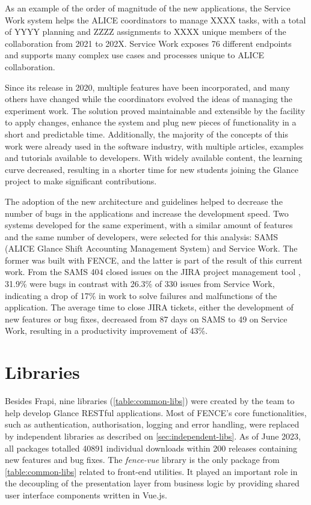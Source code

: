As an example of the order of magnitude of the new applications, the Service Work system helps the ALICE coordinators to manage XXXX tasks, with a total of YYYY planning and ZZZZ assignments to XXXX unique members of the collaboration from 2021 to 202X. Service Work exposes 76 different endpoints and supports many complex use cases and processes unique to ALICE collaboration.

Since its release in 2020, multiple features have been incorporated, and many others have changed while the coordinators evolved the ideas of managing the experiment work. The solution proved maintainable and extensible by the facility to apply changes, enhance the system and plug new pieces of functionality in a short and predictable time. Additionally, the majority of the concepts of this work were already used in the software industry, with multiple articles, examples and tutorials available to developers. With widely available content, the learning curve decreased, resulting in a shorter time for new students joining the Glance project to make significant contributions.

The adoption of the new architecture and guidelines helped to decrease the number of bugs in the applications and increase the development speed. Two systems developed for the same experiment, with a similar amount of features and the same number of developers, were selected for this analysis: SAMS (ALICE Glance Shift Accounting Management System) \cite{heron-tcc} and Service Work. The former was built with FENCE, and the latter is part of the result of this current work. From the SAMS 404 closed issues on the JIRA project management tool \cite{jira}, 31.9\% were bugs in contrast with 26.3\% of 330 issues from Service Work, indicating a drop of 17\% in work to solve failures and malfunctions of the application. The average time to close JIRA tickets, either the development of new features or bug fixes, decreased from 87 days on SAMS to 49 on Service Work, resulting in a productivity improvement of 43\%.

\section{Libraries}

Besides Frapi, nine libraries (\autoref{table:common-libs}) were created by the team to help develop Glance RESTful applications. Most of FENCE's core functionalities, such as authentication, authorisation, logging and error handling, were replaced by independent libraries as described on \autoref{sec:independent-libs}. As of June 2023, all packages totalled 40891 individual downloads within 200 releases containing new features and bug fixes. The \textit{fence-vue} \cite{fence-vue} \cite{de-jesus-tcc} library is the only package from \autoref{table:common-libs} related to front-end utilities. It played an important role in the decoupling of the presentation layer from business logic by providing shared user interface components written in Vue.js.

